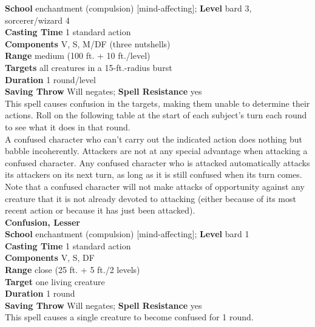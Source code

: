 \textbf{School }enchantment (compulsion) [mind-affecting]; \textbf{Level }bard 3, sorcerer/wizard 4\\
\textbf{Casting Time }1 standard action\\
\textbf{Components }V, S, M/DF (three nutshells)\\
\textbf{Range }medium (100 ft. + 10 ft./level)\\
\textbf{Targets }all creatures in a 15-ft.-radius burst\\
\textbf{Duration }1 round/level\\
\textbf{Saving Throw} Will negates; \textbf{Spell Resistance} yes\\
This spell causes confusion in the targets\textit{, }making them unable to determine their actions. Roll on the following table at the start of each subject's turn each round to see what it does in that round.\\
A confused character who can't carry out the indicated action does nothing but babble incoherently. Attackers are not at any special advantage when attacking a confused character. Any confused character who is attacked automatically attacks its attackers on its next turn, as long as it is still confused when its turn comes. Note that a confused character will not make attacks of opportunity against any creature that it is not already devoted to attacking (either because of its most recent action or because it has just been attacked).\\
\textbf{Confusion, Lesser}\\
\textbf{School }enchantment (compulsion) [mind-affecting]; \textbf{Level }bard 1\\
\textbf{Casting Time }1 standard action\\
\textbf{Components }V, S, DF\\
\textbf{Range }close (25 ft. + 5 ft./2 levels)\\
\textbf{Target }one living creature\\
\textbf{Duration }1 round\\
\textbf{Saving Throw} Will negates; \textbf{Spell Resistance} yes\\
This spell causes a single creature to become confused for 1 round. \\
